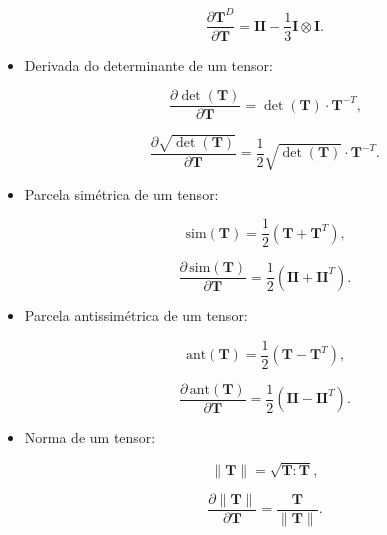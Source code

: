 \documentclass[_ArquivoPrincipal.tex]{subfiles}
\begin{document}
\begin{itemize}[leftmargin=\parindent,labelwidth=\parindent,labelsep=0.3cm]
	\begin{equation}
	\dfrac{\partial \mathbf{T}^D}{\partial \mathbf{T}} = \mathbf{II} - \dfrac{1}{3} \mathbf{I}\otimes\mathbf{I} \text{.} \label{eq:ddev}
	\end{equation}
	
	\item Derivada do determinante de um tensor:
	
	\begin{equation}
	\dfrac{\partial \det(\mathbf{T})}{\partial \mathbf{T}} = \det(\mathbf{T})\cdot\mathbf{T}^{-T} \text{,} \label{eq:ddet}
	\end{equation}
	
	\begin{equation}
	\dfrac{\partial \sqrt{\det(\mathbf{T})}}{\partial \mathbf{T}} = \dfrac{1}{2}\sqrt{\det(\mathbf{T})}\cdot\mathbf{T}^{-T} \text{.} \label{eq:dsqrtdet}
	\end{equation}
	
	\item Parcela simétrica de um tensor:
	
	\begin{equation}
	\text{sim}(\mathbf{T}) = \dfrac{1}{2}(\mathbf{T} + \mathbf{T}^T) \text{,} \label{eq:sim}
	\end{equation}
	
	\begin{equation}
	\dfrac{\partial\, \text{sim}(\mathbf{T})}{\partial \mathbf{T}} = \dfrac{1}{2}(\mathbf{II} + \mathbf{II}^T) \text{.}\label{eq:dsim}
	\end{equation}
	
	\item Parcela antissimétrica de um tensor:
	
	\begin{equation}
	\text{ant}(\mathbf{T}) = \dfrac{1}{2}(\mathbf{T} - \mathbf{T}^T) \text{,} \label{eq:ant}
	\end{equation}
	
	\begin{equation}
	\dfrac{\partial\, \text{ant}(\mathbf{T})}{\partial \mathbf{T}} = \dfrac{1}{2}(\mathbf{II} - \mathbf{II}^T) \text{.}\label{eq:dant}
	\end{equation}
	
	\item Norma de um tensor:
	
	\begin{equation}\label{eq:dnorm}
	\|\mathbf{T}\|=\sqrt{\mathbf{T}:\mathbf{T}} ,
	\end{equation}
	
	\begin{equation}
	\dfrac{\partial\| \mathbf{T} \|}{\partial \mathbf{T}} = \dfrac{\mathbf{T}}{\| \mathbf{T} \|} .
	\end{equation}
	
\end{itemize}

\end{document}
